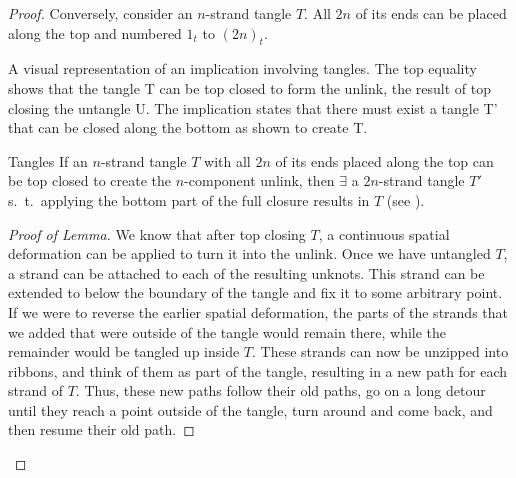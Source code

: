 \begin{paper}
\begin{proof}
Conversely, consider an $n$-strand tangle $T$.
All $2n$ of its ends can be placed along the top and numbered $1_t$ to $(2n)_t$.

{A visual representation of an implication involving tangles.
The top equality shows that the tangle T can be top closed to
form the unlink, the result of top closing the untangle U.
The implication states that there must exist a tangle T' that can be closed
along the bottom as shown to create T.}

\begin{paperlem}{Tangles}
If an $n$-strand tangle $T$ with all $2n$ of its ends placed along the top can
be top closed to create the $n$-component unlink, then $\exists$ a $2n$-strand
tangle $T'$ s.~t.~applying the bottom part of the full closure results in $T$
(see \figLemma).
\end{paperlem}

\begin{proof}[Proof of Lemma]
We know that after top closing $T$, a continuous spatial deformation can be
applied to turn it into the unlink.
Once we have untangled $T$, a strand can be attached to each of the resulting
unknots.
This strand can be extended to below the boundary of the tangle and fix it to
some arbitrary point.
If we were to reverse the earlier spatial deformation, the parts of the strands
that we added that were outside of the tangle would remain there, while the
remainder would be tangled up inside $T$.
These strands can now be unzipped into ribbons, and think of them as part of the
tangle, resulting in a new path for each strand of $T$.
Thus, these new paths follow their old paths, go on a long detour until they
reach a point outside of the tangle, turn around and come back, and then resume
their old path.


\end{proof}
\end{proof}
\end{paper}
